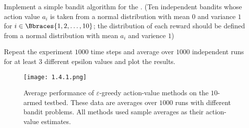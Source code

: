 
\begin{exercise}

Implement a simple bandit algorithm for the .
(Ten independent bandits whose action value $a_i$ is taken from a normal distribution with mean $0$ and variance $1$ for $i \in \Bbraces{1, 2, \dots, 10}$; the distribution of each reward should be defined from a normal distribution with mean $a_i$ and varience $1$)

Repeat the experiment $1000$ time steps and average over $1000$ independent runs for at least $3$ different epsilon values and plot the results.

\end{exercise}


\begin{solution}

\phantom{}

\begin{figure}[H]
    \centering
    \texttt{[image: 1.4.1.png]}
    \caption
    {
        Average performance of $\varepsilon$-greedy action-value methods on the $10$-armed testbed.
        These data are averages over $1000$ runs with different bandit problems.
        All methods used sample averages as their action-value estimates.
    }
    \label{fig:1.4}
\end{figure}

\end{solution}


